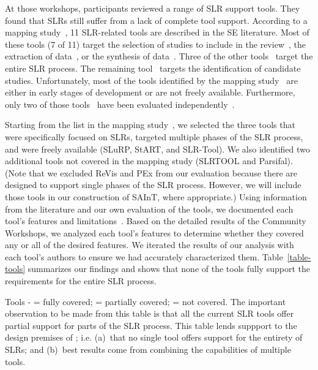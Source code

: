 At those workshops, participants reviewed a range of
SLR support tools.
They found that SLRs still suffer from a lack of complete tool support.
According to a mapping study~\cite{Marshall-Brereton:13}, 11 SLR-related tools are described in the SE literature. 
Most of these tools (7 of 11) target the selection of studies to include in the review~\cite{MS:11,MS:13,MS:14,MS:21,MS:22}, the extraction of data~\cite{MS:12,MS:18,MS:21}, or the synthesis of data~\cite{MS:12,MS:16,MS:17,MS:20}.
Three of the other tools~\cite{MS:15,MS:19,MS:23} target the entire SLR process.
The remaining tool~\cite{MS:24} targets the identification of candidate studies.
Unfortunately, most of the tools identified by the mapping study~\cite{Marshall-Brereton:13} are either in early stages of development or are not freely available.
Furthermore, only two of those tools~\cite{MS:18,MS:23} have been evaluated independently~\cite{Marshall-Brereton:13}.

Starting from the list in the mapping study~\cite{Marshall-Brereton:13}, we selected the three tools that were specifically focused on SLRs, targeted multiple phases of the SLR process, and were freely available (SLuRP, StART, and SLR-Tool).
We also identified two additional tools not covered in the mapping study (SLRTOOL and Parsifal).
(Note that we excluded ReVis and PEx from our evaluation because there are designed to support single phases of the SLR process. However, we will include those tools in our construction of SAInT, where appropriate.)
Using information from the literature and our own evaluation of the tools, we documented each tool's features and limitations~\cite{Al-Zubidy-Carver:14}.
Based on the detailed results of the Community Workshops, we analyzed each tool's features to determine whether they covered any or all of the desired features.
We iterated the results of our analysis with each tool's authors to ensure we had accurately characterized them.
Table~\ref{table-tools} summarizes our findings and shows that none of the tools fully support the requirements for the entire SLR process.

\begin{table}
	\centering
	\caption{Tools -  = fully covered;  = partially covered;  = not covered. The important observation to be made from this table is that all the current SLR tools
	offer partial support for parts of the SLR process. This table lends suppport
	to the design premises of {\IT}; i.e. (a)~that
	no single tool offers support for the entirety of SLRs; and (b)~best results come from combining
	the capabilities of multiple tools.}
	
	\label{table-tools}
\end{table}

